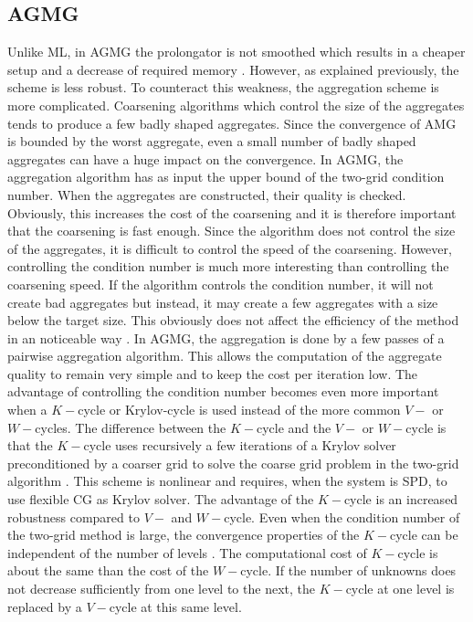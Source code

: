 \subsection{AGMG}
Unlike ML, in AGMG the prolongator is not smoothed which results in a
cheaper setup and a decrease of required memory \cite{agmg2}. However, as
explained previously, the scheme is less robust. To counteract this weakness, the
aggregation scheme is more complicated. Coarsening algorithms which control
the size of the aggregates tends to produce a few badly shaped aggregates.
Since the convergence of AMG is bounded by the worst aggregate, even a small 
number of badly shaped aggregates can have a huge impact on
the convergence. In AGMG, the aggregation algorithm has as input the upper
bound of the two-grid condition number. When the aggregates are constructed,
their quality is checked. Obviously, this increases the cost of the coarsening
and it is therefore important that the coarsening is fast enough. Since the 
algorithm does not control the size of the aggregates, it is difficult to 
control the speed of the coarsening. However, controlling the condition number
is much more interesting than controlling the coarsening speed. If the algorithm 
controls the condition number, it will not create bad aggregates but instead, it 
may create a few aggregates with a size below the target size. This obviously 
does not affect the efficiency of the method in an noticeable way \cite{agmg2}. 
In AGMG, the aggregation is done by a few passes of a pairwise aggregation 
algorithm. This allows the computation of the aggregate quality to remain very 
simple and to keep the cost per iteration low. The advantage of controlling the 
condition number becomes even more important when a $K-$cycle or Krylov-cycle is 
used instead of the more common $V-$ or $W-$cycles. The difference between the 
$K-$cycle and the $V-$ or $W-$cycle is that the $K-$cycle uses recursively a 
few iterations of a Krylov solver preconditioned by a coarser grid to solve 
the coarse grid problem in the two-grid algorithm \cite{k_cycle}. This scheme 
is nonlinear and requires, when the system is SPD, to use flexible CG 
\cite{fcg,fcg_2,fcg_3,fcg_4} as Krylov solver. The advantage of the $K-$cycle is 
an increased robustness compared to $V-$ and $W-$cycle. Even when the condition 
number of the two-grid method is large, the convergence properties of the 
$K-$cycle can be independent of the number of levels \cite{k_cycle}. The 
computational cost of $K-$cycle is about the same than the cost of the 
$W-$cycle. If the number of unknowns does not decrease sufficiently from one 
level to the next, the $K-$cycle at one level is replaced by a $V-$cycle at 
this same level.

